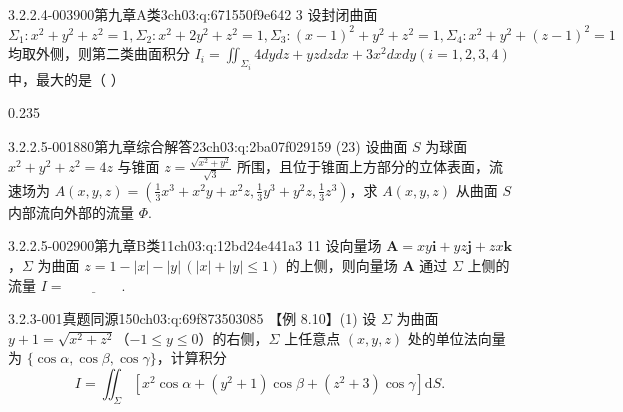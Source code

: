 \begin{q}{3.2.2.4-003}{900第九章A类3}{ch03:q:671550f9e642}
3 设封闭曲面 $\Sigma_1:x^2+y^2+z^2=1,\Sigma_2:x^2+2y^2+z^2=1,\Sigma_3:(x-1)^2+y^2+z^2=1,\Sigma_4:x^2+y^2+(z-1)^2=1$ 均取外侧，则第二类曲面积分 $\displaystyle I_i=\iint_{\Sigma_i}4dydz+yzdzdx+3x^2dxdy(i=1,2,3,4)$ 中，最大的是（ ）
\begin{opts}{0.235}
\hfill{}\hfill{}\hfill{}
\end{opts}
\end{q}

\par\addvspace{2.4ex}\noindent
\begin{minipage}{\linewidth}

\begin{q}{3.2.2.5-001}{880第九章综合解答23}{ch03:q:2ba07f029159}
(23) 设曲面 $S$ 为球面 $x^2+y^2+z^2=4z$ 与锥面 $z=\frac{\sqrt{x^2+y^2}}{\sqrt{3}}$ 所围，且位于锥面上方部分的立体表面，流速场为 $A(x,y,z)=\left(\frac{1}{3}x^3+x^2y+x^2z,\frac{1}{3}y^3+y^2z,\frac{1}{3}z^3\right)$，求 $A(x,y,z)$ 从曲面 $S$ 内部流向外部的流量 $\Phi$.
\end{q}
\end{minipage}


\begin{q}{3.2.2.5-002}{900第九章B类11}{ch03:q:12bd24e441a3}
11 设向量场 $\boldsymbol{A}=xy\boldsymbol{i}+yz\boldsymbol{j}+zx\boldsymbol{k}$，$\Sigma$ 为曲面 $z=1-|x|-|y|\,(|x|+|y|\le 1)$ 的上侧，则向量场 $\boldsymbol{A}$ 通过 $\Sigma$ 上侧的流量 $I=\underline{\hspace{4em}}$.
\end{q}

\par\addvspace{2.4ex}\noindent
\begin{minipage}{\linewidth}

\begin{q}{3.2.3-001}{真题同源150}{ch03:q:69f873503085}
【例 8.10】(1) 设 $\Sigma$ 为曲面 $y+1=\sqrt{x^2+z^2}$（$-1\le y\le 0$）的右侧，$\Sigma$ 上任意点 $(x,y,z)$ 处的单位法向量为 $\{\cos\alpha,\cos\beta,\cos\gamma\}$，计算积分
\[ I=\iint_{\Sigma}\left[x^2\cos\alpha+(y^2+1)\cos\beta+(z^2+3)\cos\gamma\right]\mathrm{d}S. \]
\end{q}
\end{minipage}


